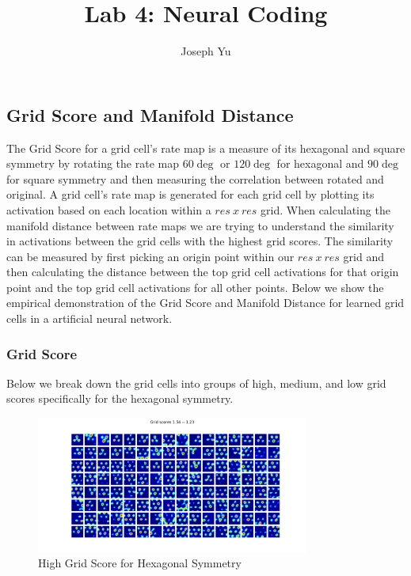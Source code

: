 \documentclass[12pt, letterpaper]{article}
\author{Joseph Yu}
\title{Lab 4: Neural Coding}
\begin{document}
\maketitle
\setcounter{section}{3}
\subsection{Grid Score and Manifold Distance}
The Grid Score for a grid cell's rate map is a measure of its hexagonal and square symmetry by rotating the rate map $60\deg$ or $120\deg$ for hexagonal and $90\deg$ for square symmetry and then measuring the correlation between rotated and original. A grid cell's rate map is generated for each grid cell by plotting its activation based on each location within a $res\ x\ res$ grid. When calculating the manifold distance between rate maps we are trying to understand the similarity in activations between the grid cells with the highest grid scores. The similarity can be measured by first picking an origin point within our $res\ x\ res$ grid and then calculating the distance between the top grid cell activations for that origin point and the top grid cell activations for all other points. Below we show the empirical demonstration of the Grid Score and Manifold Distance for learned grid cells in a artificial neural network.

\subsubsection{Grid Score}

Below we break down the grid cells into groups of high, medium, and low grid scores specifically for the hexagonal symmetry. 

\begin{figure}[H]
    \centering
    \includegraphics[width=0.8\textwidth]{high_grid_scores.png}
    \caption{High Grid Score for Hexagonal Symmetry}
    \label{fig:high_grid_scores}
\end{figure}
\end{document}
